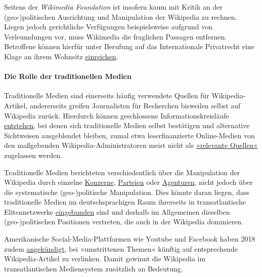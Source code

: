 Seitens der \emph{Wikimedia Foundation} ist insofern kaum mit Kritik an
der (geo-)politischen Ausrichtung und Manipulation der Wikipedia zu
rechnen. Liegen jedoch gerichtliche Verfügungen beispielsweise aufgrund
von Verleumdungen vor, muss Wikimedia die fraglichen Passagen entfernen.
Betroffene können hierfür unter Berufung auf das Internationale
Privatrecht eine Klage an ihrem Wohnsitz
\href{https://swprs.org/wikipedia-missbrauch-massnahmen/}{einreichen}.

\hypertarget{die-rolle-der-traditionellen-medien}{%
\paragraph{Die Rolle der traditionellen
Medien}\label{die-rolle-der-traditionellen-medien}}

Traditionelle Medien sind einerseits häufig verwendete Quellen für
Wikipedia-Artikel, andererseits greifen Journalisten für Recherchen
bisweilen selbst auf Wikipedia zurück. Hierdurch können geschlossene
Informationskreisläufe
\href{https://de.wikipedia.org/wiki/Kritik_an_Wikipedia\#Zweifelhafte_Quellenlage}{entstehen},
bei denen sich traditionelle Medien selbst bestätigen und alternative
Sichtweisen ausgeblendet bleiben, zumal etwa leserfinanzierte
Online-Medien von den maßgebenden Wikipedia-Administratoren meist nicht
als
\href{https://de.wikipedia.org/wiki/Wikipedia:Relevanzkriterien}{»relevante
Quellen«} zugelassen werden.

Traditionelle Medien berichteten verschiedentlich über die Manipulation
der Wikipedia durch einzelne
\href{http://www.spiegel.de/wirtschaft/wikipedia-das-geschoente-bild-vom-daimler-konzern-a-817802.html}{Konzerne},
\href{https://www.fr.de/politik/steckt-hinter-afd-freund-lukati-11059673.html}{Parteien}
oder
\href{https://www.vice.com/de/article/znky4j/wikipedia-manipulation-812}{Agenturen},
nicht jedoch über die systematische (geo-)politische Manipulation. Dies
könnte daran liegen, dass traditionelle Medien im deutschsprachigen Raum
ihrerseits in trans­atlantische Elitennetzwerke
\href{https://swprs.org/netzwerk-medien-deutschland/}{eingebunden} sind
und deshalb im Allgemeinen dieselben (geo-)politischen Positionen
vertreten, die auch in der Wikipedia dominieren.

Amerikanische Social-Media-Plattformen wie Youtube und Facebook haben
2018 zudem
\href{https://www.heise.de/newsticker/meldung/Maechtigstes-Werkzeug-zur-Radikalisierung-Youtube-will-mit-Wikipedia-Links-Verschwoerungstheorien-3994112.html}{angekündigt},
bei »umstrittenen Themen« künftig auf entsprechende Wikipedia-Artikel zu
verlinken. Damit gewinnt die Wikipedia im transatlantischen Mediensystem
zusätzlich an Bedeutung.

